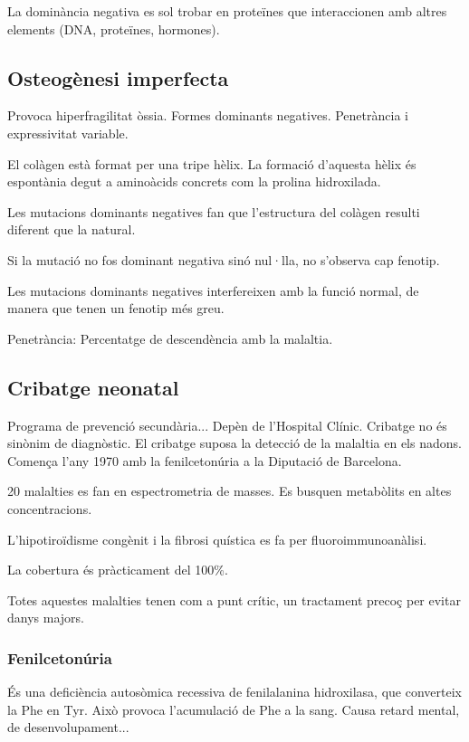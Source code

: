 La dominància negativa es sol trobar en proteïnes que interaccionen amb altres elements (DNA, proteïnes, hormones).

\subsection{Osteogènesi imperfecta}
Provoca hiperfragilitat òssia. Formes dominants negatives. Penetrància i expressivitat variable.


El colàgen està format per una tripe hèlix. La formació d'aquesta hèlix és espontània degut a aminoàcids concrets com la prolina hidroxilada.

Les mutacions dominants negatives fan que l'estructura del colàgen resulti diferent que la natural.

Si la mutació no fos dominant negativa sinó nul·lla, no s'observa cap fenotip.

Les mutacions dominants negatives interfereixen amb la funció normal, de manera que tenen un fenotip més greu.

Penetrància: Percentatge de descendència amb la malaltia.

\subsection{Cribatge neonatal}
Programa de prevenció secundària... Depèn de l'Hospital Clínic. Cribatge no és sinònim de diagnòstic. El cribatge suposa la detecció de la malaltia en els nadons. Comença l'any 1970 amb la fenilcetonúria a la Diputació de Barcelona.

20 malalties es fan en espectrometria de masses. Es busquen metabòlits en altes concentracions.

L'hipotiroïdisme congènit i la fibrosi quística es fa per fluoroimmunoanàlisi.

La cobertura és pràcticament del 100\%.

Totes aquestes malalties tenen com a punt crític, un tractament precoç per evitar danys majors.

\subsubsection{Fenilcetonúria}
És una deficiència autosòmica recessiva de fenilalanina hidroxilasa, que converteix la Phe en Tyr. Això provoca l'acumulació de Phe a la sang. Causa retard mental, de desenvolupament...

